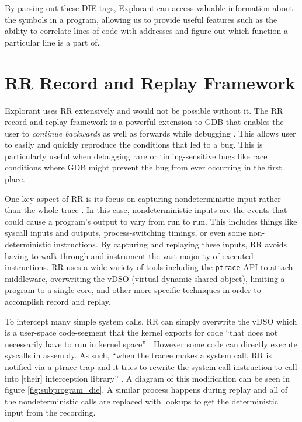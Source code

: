 By parsing out these DIE tags, Explorant can access valuable information about the symbols in a program, allowing us to provide useful features such as the ability to correlate lines of code with addresses and figure out which function a particular line is a part of. 

\section{RR Record and Replay Framework}
Explorant uses RR \cite{rr-site} extensively and would not be possible without it. The RR record and replay framework is a powerful extension to GDB that enables the user to \textit{continue backwards} as well as forwards while debugging \cite{rr-site}. This allows user to easily and quickly reproduce the conditions that led to a bug. This is particularly useful when debugging rare or timing-sensitive bugs like race conditions where GDB might prevent the bug from ever occurring in the first place.

One key aspect of RR is its focus on capturing nondeterministic input rather than the whole trace \cite{rr-site}. In this case, nondeterministic inputs are the events that could cause a program's output to vary from run to run. This includes things like syscall inputs and outputs, process-switching timings, or even some non-deterministic instructions. By capturing and replaying these inputs, RR avoids having to walk through and instrument the vast majority of executed instructions. RR uses a wide variety of tools including the \texttt{ptrace} API \cite{ptrace-site} to attach middleware, overwriting the vDSO (virtual dynamic shared object), limiting a program to a single core, and other more specific techniques in order to accomplish record and replay. 

To intercept many simple system calls, RR can simply overwrite the vDSO which is a user-space code-segment that the kernel exports for code ``that does not necessarily have to run in kernel space'' \cite{vdso}. However some code can directly execute syscalls in assembly. As such, ``when the tracee makes a system call, RR is notified via a ptrace trap and it tries to rewrite the system-call instruction to call into [their] interception library'' \cite[p.~8]{rr}. A diagram of this modification can be seen in figure \ref{fig:subprogram_die}. A similar process happens during replay and all of the nondeterministic calls are replaced with lookups to get the deterministic input from the recording.

